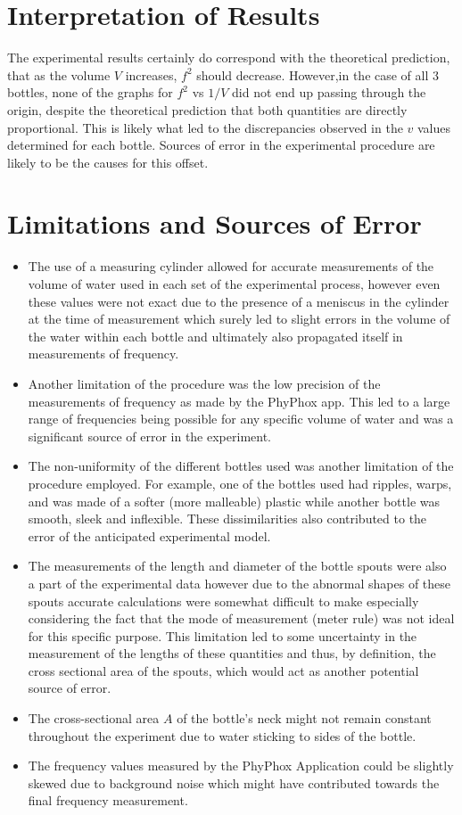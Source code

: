 \documentclass[10pt, a4paper]{article}
\begin{document}
\newpage

\section*{Interpretation of Results}
The experimental results certainly do correspond with the theoretical prediction, that as the volume $V$ increases, $f^2$ should decrease. However,in the case of all 3 bottles, none of the graphs for $f^2$ vs $1/V$ did not end up passing through the origin, despite the theoretical prediction that both quantities are directly proportional. This is likely what led to the discrepancies observed in the $v$ values determined for each bottle. Sources of error in the experimental procedure are likely to be the causes for this offset.

\section*{Limitations and Sources of Error}
\begin{itemize}
    \item The use of a measuring cylinder allowed for accurate measurements of the volume of water used in each set of the experimental process, however even these values were not exact due to the presence of a meniscus in the cylinder at the time of measurement which surely led to slight errors in the volume of the water within each bottle and ultimately also propagated itself in measurements of frequency.
    \item Another limitation of the procedure was the low precision of the measurements of frequency as made by the PhyPhox app. This led to a large range of frequencies being possible for any specific volume of water and was a significant source of error in the experiment.
    \item The non-uniformity of the different bottles used was another limitation of the procedure employed. For example, one of the bottles used had ripples, warps, and was made of a softer (more malleable) plastic while another bottle was smooth, sleek and inflexible. These dissimilarities also contributed to the error of the anticipated experimental model.
    \item The measurements of the length and diameter of the bottle spouts were also a part of the experimental data however due to the abnormal shapes of these spouts accurate calculations were somewhat difficult to make especially considering the fact that the mode of measurement (meter rule) was not ideal for this specific purpose. This limitation led to some uncertainty in the measurement of the lengths of these quantities and thus, by definition, the cross sectional area of the spouts, which would act as another potential source of error.  
    \item The cross-sectional area $A$ of the bottle's neck might not remain constant throughout the experiment due to water sticking to sides of the bottle. 
    \item The frequency values measured by the PhyPhox Application could be slightly skewed due to background noise which might have contributed towards the final frequency measurement.
\end{itemize}
\end{document}
